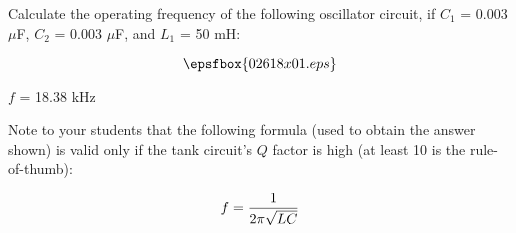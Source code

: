 

Calculate the operating frequency of the following oscillator circuit, if $C_1$ = 0.003 $\mu$F, $C_2$ = 0.003 $\mu$F, and $L_1$ = 50 mH:

$$\epsfbox{02618x01.eps}$$







$f$ = 18.38 kHz







Note to your students that the following formula (used to obtain the answer shown) is valid only if the tank circuit's $Q$ factor is high (at least 10 is the rule-of-thumb):

$$f = {1 \over {2 \pi \sqrt{LC}}}$$




